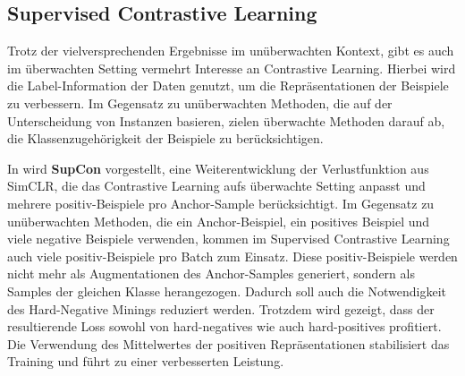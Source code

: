 \subsection{Supervised Contrastive Learning} \label{sec:sup-contrastive}

Trotz der vielversprechenden Ergebnisse im unüberwachten Kontext, gibt es auch im überwachten Setting vermehrt Interesse an Contrastive Learning. Hierbei wird die Label-Information der Daten genutzt, um die Repräsentationen der Beispiele zu verbessern. Im Gegensatz zu unüberwachten Methoden, die auf der Unterscheidung von Instanzen basieren, zielen überwachte Methoden darauf ab, die Klassenzugehörigkeit der Beispiele zu berücksichtigen.

In \parencite{Khosla2021supcon} wird \textbf{SupCon} vorgestellt, eine Weiterentwicklung der Verlustfunktion aus SimCLR, die das Contrastive Learning aufs überwachte Setting anpasst und mehrere positiv-Beispiele pro Anchor-Sample berücksichtigt. Im Gegensatz zu unüberwachten Methoden, die ein Anchor-Beispiel, ein positives Beispiel und viele negative Beispiele verwenden, kommen im Supervised Contrastive Learning auch viele positiv-Beispiele pro Batch zum Einsatz. Diese positiv-Beispiele werden nicht mehr als Augmentationen des Anchor-Samples generiert, sondern als Samples der gleichen Klasse herangezogen. Dadurch soll auch die Notwendigkeit des Hard-Negative Minings reduziert werden. Trotzdem wird gezeigt, dass der resultierende Loss sowohl von hard-negatives wie auch hard-positives profitiert. Die Verwendung des Mittelwertes der positiven Repräsentationen stabilisiert das Training und führt zu einer verbesserten Leistung.

